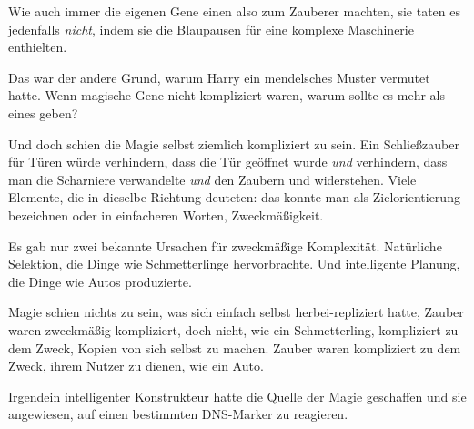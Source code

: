 Wie auch immer die eigenen Gene einen also zum Zauberer machten, sie taten es jedenfalls \emph{nicht}, indem sie die Blaupausen für eine komplexe Maschinerie enthielten.

Das war der andere Grund, warum Harry ein mendelsches Muster vermutet hatte. Wenn magische Gene nicht kompliziert waren, warum sollte es mehr als eines geben?

Und doch schien die Magie selbst ziemlich kompliziert zu sein. Ein Schließzauber für Türen würde verhindern, dass die Tür geöffnet wurde \emph{und} verhindern, dass man die Scharniere verwandelte \emph{und} den Zaubern  und  widerstehen. Viele Elemente, die in dieselbe Richtung deuteten: das konnte man als Zielorientierung bezeichnen oder in einfacheren Worten, Zweckmäßigkeit.

Es gab nur zwei bekannte Ursachen für zweckmäßige Komplexität. Natürliche Selektion, die Dinge wie Schmetterlinge hervorbrachte. Und intelligente Planung, die Dinge wie Autos produzierte.

Magie schien nichts zu sein, was sich einfach selbst herbei-repliziert hatte, Zauber waren zweckmäßig kompliziert, doch nicht, wie ein Schmetterling, kompliziert zu dem Zweck, Kopien von sich selbst zu machen. Zauber waren kompliziert zu dem Zweck, ihrem Nutzer zu dienen, wie ein Auto.

Irgendein intelligenter Konstrukteur hatte die Quelle der Magie geschaffen und sie angewiesen, auf einen bestimmten DNS-Marker zu reagieren.

